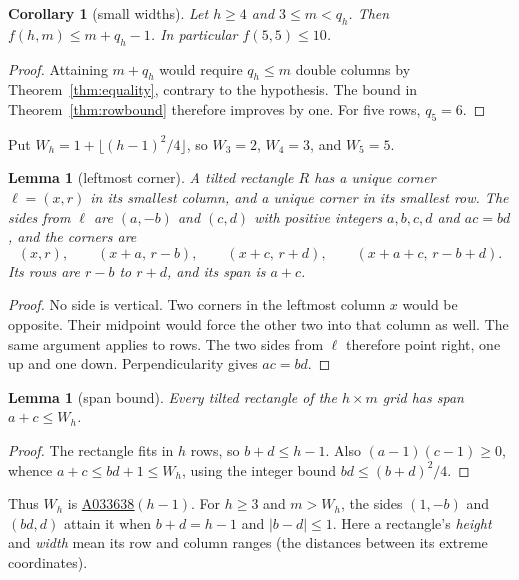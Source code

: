 \documentclass[12pt]{article}
\theoremstyle{plain}
\newtheorem{lemma}[theorem]{Lemma}
\newtheorem{corollary}[theorem]{Corollary}
\theoremstyle{definition}
\theoremstyle{remark}
\newcommand{\seqnum}[1]{\href{https://oeis.org/#1}{\rm \underline{#1}}}
\begin{document}
\begin{corollary}[small widths]\label{cor:small-m}
Let $h\ge4$ and $3\le m<q_h$. Then $f(h,m)\le m+q_h-1$. In particular $f(5,5)\le10$.
\end{corollary}

\begin{proof}
Attaining $m+q_h$ would require $q_h\le m$ double columns by
Theorem~\ref{thm:equality}, contrary to the hypothesis. The bound in
Theorem~\ref{thm:rowbound} therefore improves by one. For five rows, $q_5=6$.
\end{proof}

Put $W_h=1+\lfloor(h-1)^2/4\rfloor$, so $W_3=2$, $W_4=3$, and $W_5=5$.

\begin{lemma}[leftmost corner]\label{lem:leftmost}
A tilted rectangle $R$ has a unique corner $\ell=(x,r)$ in its smallest column, and a unique corner in its smallest row. The sides from $\ell$ are $(a,-b)$ and $(c,d)$ with positive integers $a,b,c,d$ and $ac=bd$, and the corners are
\begin{equation}\label{eq:tilt-param}
(x,r),\qquad(x+a,\,r-b),\qquad(x+c,\,r+d),\qquad(x+a+c,\,r-b+d).
\end{equation}
Its rows are $r-b$ to $r+d$, and its \emph{span} is $a+c$.
\end{lemma}

\begin{proof}
No side is vertical. Two corners in the leftmost column
$x$ would be opposite. Their midpoint would force the other two into
that column as well. The same argument applies to rows.
The two sides from $\ell$ therefore point right, one up and one down.
Perpendicularity gives $ac=bd$.
\end{proof}

\begin{lemma}[span bound]\label{lem:span}
Every tilted rectangle of the $h\times m$ grid has span $a+c\le W_h$.
\end{lemma}

\begin{proof}
The rectangle fits in $h$ rows, so $b+d\le h-1$. Also
$(a-1)(c-1)\ge0$, whence $a+c\le bd+1\le W_h$, using the integer bound
$bd\le(b+d)^2/4$.
\end{proof}

Thus $W_h$ is \seqnum{A033638}$(h-1)$. For $h\ge3$ and $m>W_h$,
the sides $(1,-b)$ and $(bd,d)$ attain it when $b+d=h-1$ and $|b-d|\le1$.
Here a rectangle's \emph{height} and \emph{width} mean its row and column
ranges (the distances between its extreme coordinates).
\end{document}
